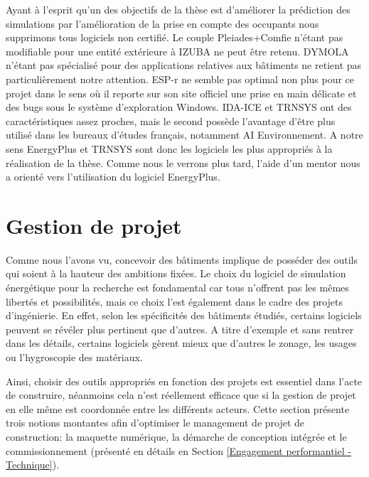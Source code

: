 Ayant à l'esprit qu'un des objectifs de la thèse est d'améliorer la prédiction des simulations par l'amélioration de la prise en compte des occupants nous supprimons tous logiciels non certifié. Le couple Pleiades+Comfie n'étant pas modifiable pour une entité extérieure à IZUBA ne peut être retenu. DYMOLA n'étant pas spécialisé pour des applications relatives aux bâtiments ne retient pas particulièrement notre attention. ESP-r ne semble pas optimal non plus pour ce projet dans le sens où il reporte sur son site officiel une prise en main délicate et des bugs sous le système d'exploration Windows. IDA-ICE et TRNSYS ont des caractéristiques assez proches, mais le second possède l'avantage d'être plus utilisé dans les bureaux d'études français, notamment AI Environnement. A notre sens EnergyPlus et TRNSYS sont donc les logiciels les plus appropriés à la réalisation de la thèse. Comme nous le verrons plus tard, l'aide d'un mentor nous a orienté vers l'utilisation du logiciel EnergyPlus.

\section{Gestion de projet}

Comme nous l'avons vu, concevoir des bâtiments implique de posséder des outils qui soient à la hauteur des ambitions fixées. Le choix du logiciel de simulation énergétique pour la recherche est fondamental car tous n'offrent pas les mêmes libertés et possibilités, mais ce choix l'est également dans le cadre des projets d'ingénierie. En effet, selon les spécificités des bâtiments étudiés, certains logiciels peuvent se révéler plus pertinent que d'autres. A titre d'exemple et  sans rentrer dans les détails, certains logiciels gèrent mieux que d'autres le zonage, les usages ou l'hygroscopie des matériaux.

Ainsi, choisir des outils appropriés en fonction des projets est essentiel dans l'acte de construire, néanmoins cela n'est réellement efficace que si la gestion de projet en elle même est coordonnée entre les différents acteurs. Cette section présente trois notions montantes afin d'optimiser le management de projet de construction: la maquette numérique, la démarche de conception intégrée et le commissionnement (présenté en détails en Section \ref{Engagement performantiel - Technique}).

